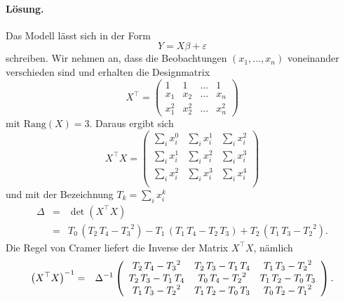 \paragraph*{Lösung. } Das Modell lässt sich in der Form
\begin{equation*}
    Y = X \beta + \varepsilon
\end{equation*}
schreiben. Wir nehmen an, dass die Beobachtungen $\left( x_1,\ldots, x_n \right)$ 
voneinander verschieden sind und erhalten die Designmatrix
\begin{equation*}
    X^\top = \left(
    \begin{array}{cccc}
        1       & 1     & \ldots & 1 \\
        x_1     & x_2   & \ldots & x_n \\
        x_1^2   & x_2^2 & \ldots & x_n^2
    \end{array}
    \right)
\end{equation*} 
mit $\textrm{Rang}(X) = 3$. Daraus ergibt sich
\begin{equation*}
    X^\top X = \left(
    \begin{array}{ccc}
        \sum_{i}^{} x_i^0 & \sum_{i}^{} x_i^1 & \sum_{i}^{} x_i^2 \\
        \sum_{i}^{} x_i^1 & \sum_{i}^{} x_i^2 & \sum_{i}^{} x_i^3 \\
        \sum_{i}^{} x_i^2 & \sum_{i}^{} x_i^3 & \sum_{i}^{} x_i^4 \\
    \end{array}
    \right)
\end{equation*}
und mit der Bezeichnung $T_k = \sum_{i}^{} x_i^k$ 
\begin{eqnarray*}
    \Delta &=&  \det \left( X^\top X \right) \\
    &=& { T_0}\,\left({ T_2}\,{ T_4}-{ T_3}^2\right)-{ T_1}\,\left({ T_1}\,{ T_4}-{ T_2}\,{ T_3}\right)+{ T_2}\,\left({ T_1}\,{ T_3}-{ T_2}^2\right).
\end{eqnarray*}
Die Regel von Cramer liefert die Inverse der Matrix $X^\top X$, nämlich
\begin{eqnarray*}
    \left( X^\top X \right)^{-1} &=& \Delta^{-1} \left(
    \begin{array}{ccc}
{ T_2}\,{ T_4}-{ T_3}^2&{ T_2}\,{ T_3}-
 { T_1}\,{ T_4}&{ T_1}\,{ T_3}-{ T_2}^2\cr { T_2}\,
 { T_3}-{ T_1}\,{ T_4}&{ T_0}\,{ T_4}-{ T_2}^2&
 { T_1}\,{ T_2}-{ T_0}\,{ T_3}\cr { T_1}\,{ T_3}-
 { T_2}^2&{ T_1}\,{ T_2}-{ T_0}\,{ T_3}&{ T_0}\,
 { T_2}-{ T_1}^2
    \end{array}
    \right). 
\end{eqnarray*}
